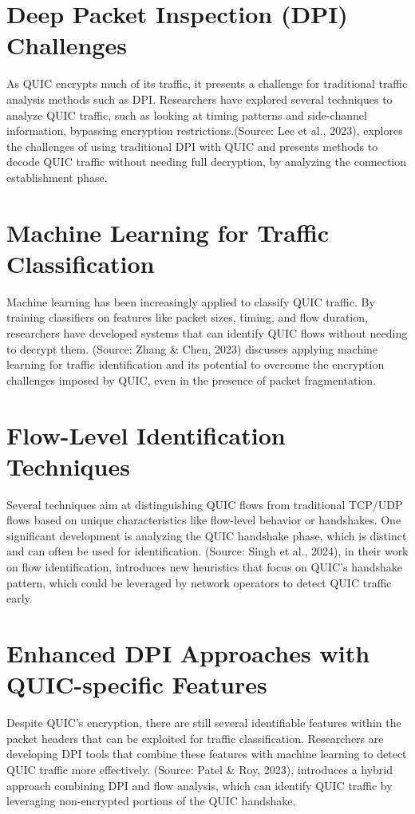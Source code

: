 \documentclass[a4paper, 10pt]{article}
\begin{document}
\section{Deep Packet Inspection (DPI) Challenges}

As QUIC encrypts much of its traffic, it presents a challenge for traditional traffic analysis methods such as DPI. Researchers have explored several techniques to analyze QUIC traffic, such as looking at timing patterns and side-channel information, bypassing encryption restrictions.(Source: Lee et al., 2023), explores the challenges of using traditional DPI with QUIC and presents methods to decode QUIC traffic without needing full decryption, by analyzing the connection establishment phase.
\section{Machine Learning for Traffic Classification}

Machine learning has been increasingly applied to classify QUIC traffic. By training classifiers on features like packet sizes, timing, and flow duration, researchers have developed systems that can identify QUIC flows without needing to decrypt them.
(Source: Zhang \& Chen, 2023) discusses applying machine learning for traffic identification and its potential to overcome the encryption challenges imposed by QUIC, even in the presence of packet fragmentation.


\section{Flow-Level Identification Techniques}

Several techniques aim at distinguishing QUIC flows from traditional TCP/UDP flows based on unique characteristics like flow-level behavior or handshakes. One significant development is analyzing the QUIC handshake phase, which is distinct and can often be used for identification.
(Source: Singh et al., 2024), in their work on flow identification, introduces new heuristics that focus on QUIC's handshake pattern, which could be leveraged by network operators to detect QUIC traffic early.
\section{Enhanced DPI Approaches with QUIC-specific Features}

Despite QUIC's encryption, there are still several identifiable features within the packet headers that can be exploited for traffic classification. Researchers are developing DPI tools that combine these features with machine learning to detect QUIC traffic more effectively.
(Source: Patel \& Roy, 2023), introduces a hybrid approach combining DPI and flow analysis, which can identify QUIC traffic by leveraging non-encrypted portions of the QUIC handshake.
\end{document}

